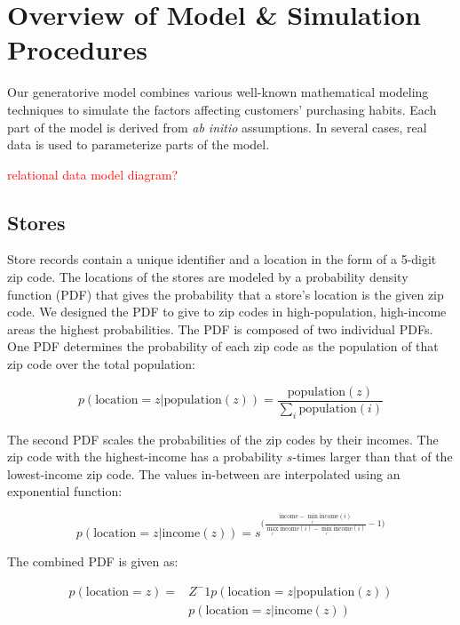 \documentclass[conference]{IEEEtran}
\begin{document}
\section{Overview of Model \& Simulation Procedures}
Our generatorive model combines various well-known mathematical modeling techniques to simulate the factors affecting customers' purchasing habits.  Each part of the model is derived from \emph{ab initio} assumptions.  In several cases, real data is used to parameterize parts of the model. 

\textcolor{red}{relational data model diagram?}

\subsection{Stores}


Store records contain a unique identifier and a location in the form of a 5-digit zip code.  The locations of the stores are modeled by a probability density function (PDF) that gives the probability that a store's location is the given zip code. We designed the PDF to give to zip codes in high-population, high-income areas the highest probabilities. The PDF is composed of two individual PDFs. One PDF determines the probability of each zip code as the population of that zip code over the total population:

\begin{equation}
p(\text{location}=z | \text{population}(z)) = \frac{\text{population}(z)}{\sum_{i} \text{population}(i)}
\end{equation}

The second PDF scales the probabilities of the zip codes by their incomes.  The zip code with the highest-income has a probability $s$-times larger than that of the lowest-income zip code. The values in-between are interpolated using an exponential function:


\begin{equation}
p(\text{location}=z | \text{income}(z)) = s ^ {\big( \frac{\text{income} - \min_i{\textrm{income}(i)}} {\max_i{\textrm{income}(i)} - \min_i{\textrm{income}(i)}} - 1 \big)}
\end{equation}

The combined PDF is given as: 

\begin{align}
p(\text{location}=z) = &Z^-1 p(\text{location}=z | \text{population}(z)) \nonumber \\
&p(\text{location}=z | \text{income}(z))
\end{align}
\end{document}
